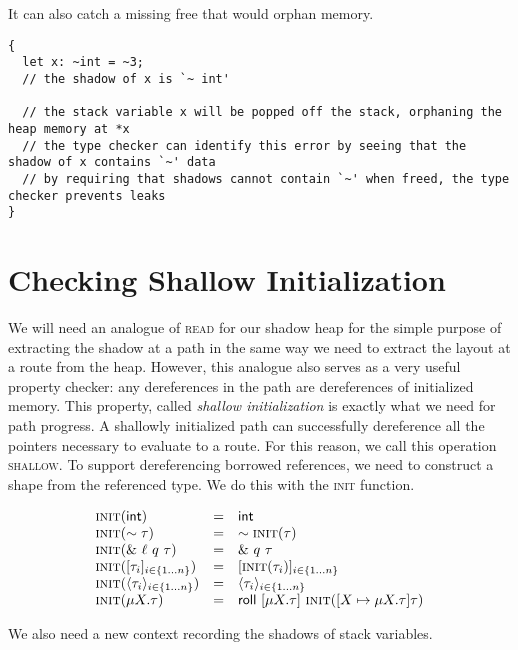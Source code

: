 It can also catch a missing free that would orphan memory.
\begin{verbatim}
{
  let x: ~int = ~3;
  // the shadow of x is `~ int'

  // the stack variable x will be popped off the stack, orphaning the heap memory at *x
  // the type checker can identify this error by seeing that the shadow of x contains `~' data
  // by requiring that shadows cannot contain `~' when freed, the type checker prevents leaks
}
\end{verbatim}

\section*{Checking Shallow Initialization}
We will need an analogue of \textsc{read} for our shadow heap for the
simple purpose of extracting the shadow at a path in the same way we
need to extract the layout at a route from the heap.
However, this analogue also serves as a very useful property checker:
any dereferences in the path are dereferences of initialized memory.
This property, called \emph{shallow initialization} is exactly what we need
for path progress. A shallowly initialized path can successfully dereference
all the pointers necessary to evaluate to a route.
For this reason, we call this operation \textsc{shallow}.
To support dereferencing borrowed references, 
we need to construct a shape from the referenced type.
We do this with the \textsc{init} function.
\newline


\[
\begin{array}{lcl}
\textsc{init}({\mathsf{int}}) &=& \mathsf{int} \\
\textsc{init}({\sim{\tau}}) &=& \sim{\textsc{init}({\tau})} \\
\textsc{init}({\&~{{\ell}~{q}~{\tau}}}) &=& \&~{{q}~{\tau}} \\
\textsc{init}({[{{\tau}_{i}}]_{{i} \in \{1 \ldots {n}\} }}) &=& [\textsc{init}({\tau_i})]_{i \in \{1\ldots n\}} \\
\textsc{init}({\langle{{\tau}_{i}}\rangle_{{i} \in \{1 \ldots {n}\} }}) &=& \langle{{\tau}_{i}}\rangle_{{i} \in \{1 \ldots {n}\} } \\
\textsc{init}({\mu {X}.{\tau}}) &=& \mathsf{roll}~[{\mu {X}.{\tau}}]~{\textsc{init}({[{X} \mapsto {\mu {X}.{\tau}}] {\tau}})} \\
\end{array}
\]

We also need a new context recording the shadows of stack variables.

